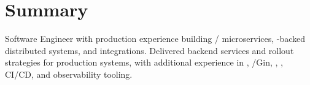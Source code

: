 \section*{Summary}
\BigDivider
\noindent
Software Engineer with production experience building /
microservices, -backed distributed systems, and  integrations.
Delivered backend services and rollout strategies for production systems, with additional
experience in , /Gin, , , CI/CD, and
observability tooling.

